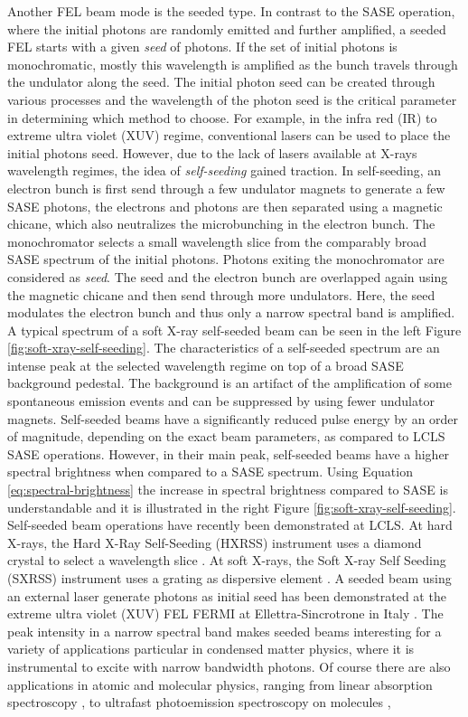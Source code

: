 Another FEL beam mode is the seeded type. In contrast to the SASE operation, where the initial photons are randomly emitted and further amplified, a seeded FEL starts with a given \textit{seed} of photons. If the set of initial photons is monochromatic, mostly this wavelength is amplified as the bunch travels through the undulator along the seed. The initial photon seed can be created through various processes and the wavelength of the photon seed is the critical parameter in determining which method to choose. For example, in the infra red (IR) to extreme ultra violet (XUV) regime, conventional lasers can be used to place the initial photons seed. However, due to the lack of lasers available at X-rays wavelength regimes, the idea of \textit{self-seeding} gained traction. In self-seeding, an electron bunch is first send through a few undulator magnets to generate a few SASE photons, the electrons and photons are then separated using a magnetic chicane, which also neutralizes the microbunching in the electron bunch. The monochromator selects a small wavelength slice from the comparably broad SASE spectrum of the initial photons. Photons exiting the monochromator are considered as \textit{seed}. The seed and the electron bunch are overlapped again using the magnetic chicane and then send through more undulators. Here, the seed modulates the electron bunch and thus only a narrow spectral band is amplified. A typical spectrum of a soft X-ray self-seeded beam can be seen in the left Figure \ref{fig:soft-xray-self-seeding}. The characteristics of a self-seeded spectrum are an intense peak at the selected wavelength regime on top of a broad SASE background pedestal. The background is an artifact of the amplification of some spontaneous emission events and can be suppressed by using fewer undulator magnets. Self-seeded beams have a significantly reduced pulse energy by an order of magnitude, depending on the exact beam parameters, as compared to LCLS SASE operations. However, in their main peak, self-seeded beams have a higher spectral brightness when compared to a SASE spectrum. Using Equation \eqref{eq:spectral-brightness} the increase in spectral brightness compared to SASE is understandable and it is illustrated in the right Figure \ref{fig:soft-xray-self-seeding}. Self-seeded beam operations have recently been demonstrated at LCLS. At hard X-rays, the Hard X-Ray Self-Seeding (HXRSS) instrument uses a diamond crystal to select a wavelength slice \citep{Amann-2012-NatPho}. At soft X-rays, the Soft X-ray Self Seeding (SXRSS) instrument uses a grating as dispersive element \citep{Ratner-2015-PRL}. A seeded beam using an external laser generate photons as initial seed has been demonstrated at the extreme ultra violet (XUV) FEL FERMI at Ellettra-Sincrotrone in Italy \citep{Allaria-2012-NatPho}. The peak intensity in a narrow spectral band makes seeded beams interesting for a variety of applications particular in condensed matter physics, where it is instrumental to excite with narrow bandwidth photons. Of course there are also applications in atomic and molecular physics, ranging from linear absorption spectroscopy \citep{Ferguson-2014-Unpublished}, to ultrafast photoemission spectroscopy on molecules \citep{Bucher-2014-Unpublished}, 